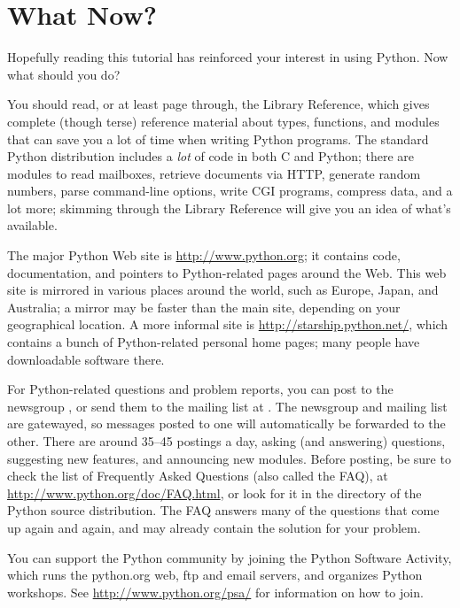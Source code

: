\documentclass{manual}
\begin{document}
\chapter{What Now? \label{whatNow}}

Hopefully reading this tutorial has reinforced your interest in using
Python.  Now what should you do?

You should read, or at least page through, the Library Reference,
which gives complete (though terse) reference material about types,
functions, and modules that can save you a lot of time when writing
Python programs.  The standard Python distribution includes a
\emph{lot} of code in both C and Python; there are modules to read
\UNIX{} mailboxes, retrieve documents via HTTP, generate random
numbers, parse command-line options, write CGI programs, compress
data, and a lot more; skimming through the Library Reference will give
you an idea of what's available.

The major Python Web site is \url{http://www.python.org}; it contains
code, documentation, and pointers to Python-related pages around the
Web.  This web site is mirrored in various places around the
world, such as Europe, Japan, and Australia; a mirror may be faster
than the main site, depending on your geographical location.  A more
informal site is \url{http://starship.python.net/}, which contains a
bunch of Python-related personal home pages; many people have
downloadable software there.

For Python-related questions and problem reports, you can post to the
newsgroup , or send them to the mailing
list at .  The newsgroup and mailing list
are gatewayed, so messages posted to one will automatically be
forwarded to the other.  There are around 35--45 postings a day,
asking (and answering) questions, suggesting new features, and
announcing new modules.  Before posting, be sure to check the list of
Frequently Asked Questions (also called the FAQ), at
\url{http://www.python.org/doc/FAQ.html}, or look for it in the
 directory of the Python source distribution.  The FAQ
answers many of the questions that come up again and again, and may
already contain the solution for your problem.

You can support the Python community by joining the Python Software
Activity, which runs the python.org web, ftp and email servers, and
organizes Python workshops.  See \url{http://www.python.org/psa/} for
information on how to join.
\end{document}

